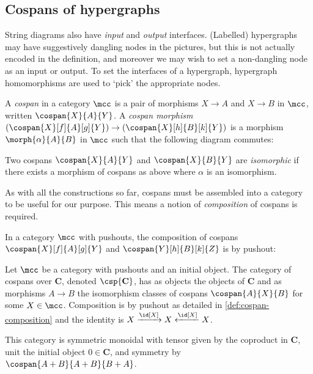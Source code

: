 \subsection{Cospans of hypergraphs}

String diagrams also have \emph{input} and \emph{output} interfaces.
(Labelled) hypergraphs may have suggestively dangling nodes in the pictures,
but this is not actually encoded in the definition, and moreover we may wish to
set a non-dangling node as an input or output.
To set the interfaces of a hypergraph, hypergraph homomorphisms are used
to `pick' the appropriate nodes.

\begin{definition}[Cospan]
    A \emph{cospan} in a category \(\mcc\) is a pair of morphisms \(X \to A\)
    and \(X \to B\) in \(\mcc\), written \(\cospan{X}{A}{Y}\).
    A \emph{cospan morphism} \(
        (\cospan{X}[f]{A}[g]{Y}) \to (\cospan{X}[h]{B}[k]{Y})
    \) is a morphism \(\morph{\alpha}{A}{B}\) in \(\mcc\)
    such that the following diagram commutes:
    \begin{center}
        
    \end{center}
%
    Two cospans \(\cospan{X}{A}{Y}\) and \(\cospan{X}{B}{Y}\) are
    \emph{isomorphic} if there exists a morphism of cospans as above where
    \(\alpha\) is an isomorphism.
\end{definition}

As with all the constructions so far, cospans must be assembled into a category
to be useful for our purpose.
This means a notion of \emph{composition} of cospans is required.

\begin{definition}
    \label{def:cospan-composition}
    In a category \(\mcc\) with pushouts, the composition of cospans
    \(\cospan{X}[f]{A}[g]{Y}\) and \(\cospan{Y}[h]{B}[k]{Z}\) is by pushout:
    \begin{center}
        
    \end{center}
\end{definition}

\begin{definition}
    Let \(\mcc\) be a category with pushouts and an initial object.
    The category of cospans over \(\mathbf{C}\), denoted \(\csp{\mathbf{C}}\),
    has as objects the objects of \(\mathbf{C}\) and as morphisms \(A \to B\)
    the isomorphism classes of cospans \(\cospan{A}{X}{B}\) for some
    \(X \in \mcc\).
    Composition is by pushout as detailed in \cref{def:cospan-composition} and
    the identity is \(X \xrightarrow{\id[X]} X \xleftarrow{\id[X]} X\).

    This category is symmetric monoidal with tensor given by the coproduct in
    \(\mathbf{C}\), unit the initial object \(0 \in \mathbf{C}\), and symmetry
    by \(\cospan{A+B}{A+B}{B+A}\).
\end{definition}

